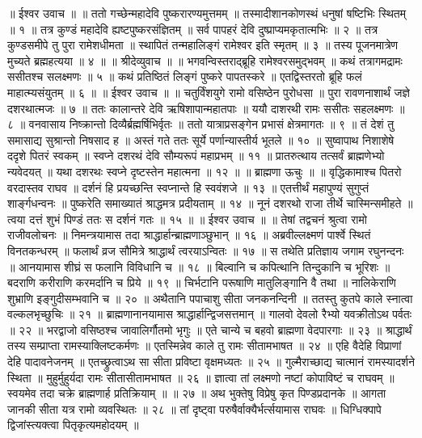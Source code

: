 ॥ ईश्वर उवाच ॥ ॥
ततो गच्छेन्महादेवि पुष्करारण्यमुत्तमम् ॥
तस्मादीशानकोणस्थं धनुषां षष्टिभिः स्थितम् ॥ १ ॥
तत्र कुण्डं महादेवि ह्यष्टपुष्करसंज्ञितम् ॥
सर्व पापहरं देवि दुष्प्राप्यमकृतात्मभिः ॥ २ ॥
तत्र कुण्डसमीपे तु पुरा रामेशधीमता ॥
स्थापितं तन्महालिङ्गं रामेश्वर इति स्मृतम् ॥ ३ ॥
तस्य पूजनमात्रेण मुच्यते ब्रह्महत्यया ॥ ४ ॥
॥ श्रीदेव्युवाच ॥ ॥
भगवन्विस्तराद्ब्रूहि रामेश्वरसमुद्भवम् ॥
कथं तत्रागमद्रामः ससीतश्च सलक्ष्मणः ॥ ५ ॥
कथं प्रतिष्ठितं लिङ्गं पुष्करे पापतस्करे ॥
एतद्विस्तरतो ब्रूहि फलं माहात्म्यसंयुतम् ॥ ६ ॥
॥ ईश्वर उवाच ॥ ॥
चतुर्विंशयुगे रामो वसिष्ठेन पुरोधसा ॥
पुरा रावणनाशार्थं जज्ञे दशरथात्मजः ॥ ७ ॥
ततः कालान्तरे देवि ऋषिशापान्महातपाः ॥
ययौ दाशरथी रामः ससीतः सहलक्ष्मणः ॥ ८ ॥
वनवासाय निष्क्रान्तो दिव्यैर्ब्रह्मर्षिभिर्वृतः ॥
ततो यात्राप्रसङ्गेन प्रभासं क्षेत्रमागतः ॥ ९ ॥
तं देशं तु समासाद्य सुश्रान्तो निषसाद ह ॥
अस्तं गते ततः सूर्ये पर्णान्यास्तीर्य भूतले ॥ १० ॥
सुष्वापाथ निशाशेषे ददृशे पितरं स्वकम् ॥
स्वप्ने दशरथं देवि सौम्यरूपं महाप्रभम् ॥ ११ ॥
प्रातरुत्थाय तत्सर्वं ब्राह्मणेभ्यो न्यवेदयत् ॥
यथा दशरथः स्वप्ने दृष्टस्तेन महात्मना ॥ १२ ॥
॥ ब्राह्मणा ऊचुः ॥ ॥
वृद्धिकामाश्च पितरो वरदास्तव राघव ॥
दर्शनं हि प्रयच्छन्ति स्वप्नान्ते हि स्ववंशजे ॥ १३ ॥
एतत्तीर्थं महापुण्यं सुगुप्तं शार्ङ्गधन्वनः ॥
पुष्करेति समाख्यातं श्राद्धमत्र प्रदीयताम् ॥ १४ ॥
नूनं दशरथो राजा तीर्थे चास्मिन्समीहते ॥
त्वया दत्तं शुभं पिण्डं ततः स दर्शनं गतः ॥ १५ ॥
॥ ईश्वर उवाच ॥ ॥
तेषां तद्वचनं श्रुत्वा रामो राजीवलोचनः ॥
निमन्त्रयामास तदा श्राद्धार्हान्ब्राह्मणाञ्छुभान् ॥ १६ ॥
अब्रवील्लक्ष्मणं पार्श्वे स्थितं विनतकन्धरम् ॥
फलार्थं व्रज सौमित्रे श्राद्धार्थं त्वरयाऽन्वितः ॥ १७ ॥
स तथेति प्रतिज्ञाय जगाम रघुनन्दनः ॥
आनयामास शीघ्रं स फलानि विविधानि च ॥ १८ ॥
बिल्वानि च कपित्थानि तिन्दुकानि च भूरिशः ॥
बदराणि करीराणि करमर्दानि च प्रिये ॥ १९ ॥
चिर्भटानि परूषाणि मातुलिङ्गानि वै तथा ॥
नालिकेराणि शुभ्राणि इङ्गुदीसम्भवानि च ॥ २० ॥
अथैतानि पपाचाशु सीता जनकनन्दिनी ॥
ततस्तु कुतपे काले स्नात्वा वल्कलभृच्छुचिः ॥ २१ ॥
ब्राह्मणानानयामास श्राद्धार्हान्द्विजसत्तमान् ॥
गालवो देवलो रैभ्यो यवक्रीतोऽथ पर्वतः ॥ २२ ॥
भरद्वाजो वसिष्ठश्च जावालिर्गौतमो भृगुः ॥
एते चान्ये च बहवो ब्राह्मणा वेदपारगाः ॥ २३ ॥
श्राद्धार्थं तस्य सम्प्राप्ता रामस्याक्लिष्टकर्मणः ॥
एतस्मिन्नेव काले तु रामः सीतामभाषत ॥ २४ ॥
एहि वैदेहि विप्राणां देहि पादावनेजनम् ॥
एतच्छ्रुत्वाऽथ सा सीता प्रविष्टा वृक्षमध्यतः ॥ २५ ॥
गुल्मैराच्छाद्य चात्मानं रामस्यादर्शने स्थिता ॥
मुहुर्मुहुर्यदा रामः सीतासीतामभाषत ॥ २६ ॥
ज्ञात्वा तां लक्ष्मणो नष्टां कोपाविष्टं च राघवम् ॥
स्वयमेव तदा चक्रे ब्राह्मणार्ह प्रतिक्रियाम् ॥ ॥ २७ ॥
अथ भुक्तेषु विप्रेषु कृत पिण्डप्रदानके ॥
आगता जानकी सीता यत्र रामो व्यवस्थितः ॥ २८ ॥
तां दृष्ट्वा परुषैर्वाक्यैर्भर्त्सयामास राघवः ॥
धिग्धिक्पापे द्विजांस्त्यक्त्वा पितृकृत्यमहोदयम् ॥
